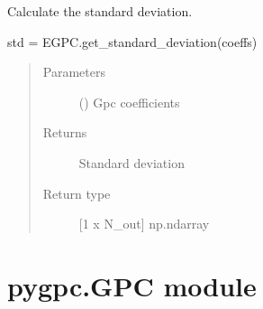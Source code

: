 \documentclass[letterpaper,10pt,english,openany,oneside]{sphinxmanual}
\begin{document}
\begin{fulllineitems}
\begin{fulllineitems}
\label{\detokenize{pygpc:pygpc.EGPC.EGPC.get_std}}
Calculate the standard deviation.

std = EGPC.get\_standard\_deviation(coeffs)
\begin{quote}\begin{description}
\item[{Parameters}] \leavevmode
{} (\sphinxstyleliteralemphasis{\sphinxupquote{ {[}}}\sphinxstyleliteralemphasis{\sphinxupquote{{]}}}) \textendash{} Gpc coefficients

\item[{Returns}] \leavevmode
{} \textendash{} Standard deviation

\item[{Return type}] \leavevmode
{[}1 x N\_out{]} np.ndarray

\end{description}\end{quote}

\end{fulllineitems}


\end{fulllineitems}



\section{pygpc.GPC module}
\label{\detokenize{pygpc:module-pygpc.GPC}}\label{\detokenize{pygpc:pygpc-gpc-module}}
\end{document}
